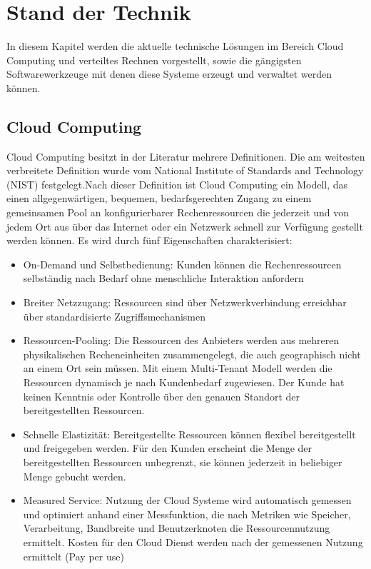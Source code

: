 \chapter{Stand der Technik}

In diesem Kapitel werden die aktuelle technische Lösungen im Bereich Cloud Computing und verteiltes Rechnen vorgestellt, sowie die gängigsten Softwarewerkzeuge mit denen diese Systeme erzeugt und verwaltet werden können.

\section{Cloud Computing}
Cloud Computing besitzt in der Literatur mehrere Definitionen.\cite{Marston2011} Die am weitesten verbreitete Definition wurde vom National Institute of Standards and Technology (NIST) festgelegt.Nach dieser Definition ist Cloud Computing ein Modell, das einen allgegenwärtigen, bequemen, bedarfsgerechten Zugang zu einem gemeinsamen Pool an konfigurierbarer Rechenressourcen die jederzeit und von jedem Ort aus über das Internet oder ein Netzwerk schnell zur Verfügung gestellt 
werden können. Es wird durch fünf Eigenschaften charakterisiert:   \\
\begin{itemize}
	\item On-Demand und Selbstbedienung: Kunden können die Rechenressourcen selbständig nach Bedarf ohne menschliche Interaktion anfordern
	\item Breiter Netzzugang: Ressourcen sind über Netzwerkverbindung erreichbar über standardisierte Zugriffsmechanismen
	\item Ressourcen-Pooling: Die Ressourcen des Anbieters werden aus mehreren physikalischen Recheneinheiten zusammengelegt, die auch geographisch nicht an einem Ort sein müssen. Mit einem Multi-Tenant Modell werden die Ressourcen dynamisch je nach Kundenbedarf zugewiesen. Der Kunde hat keinen Kenntnis oder Kontrolle über den genauen Standort der bereitgestellten Ressourcen.
	\item Schnelle Elastizität: Bereitgestellte Ressourcen können flexibel bereitgestellt und freigegeben werden. Für den Kunden erscheint die Menge der bereitgestellten Ressourcen unbegrenzt, sie können jederzeit in beliebiger Menge gebucht werden.
	\item Measured Service: Nutzung der Cloud Systeme wird automatisch gemessen und optimiert anhand einer Messfunktion, die nach Metriken wie Speicher, Verarbeitung, Bandbreite und Benutzerknoten die Ressourcennutzung ermittelt. Kosten für den Cloud Dienst werden nach der gemessenen Nutzung ermittelt (Pay per use) \cite{Mell2011}
\end{itemize}

